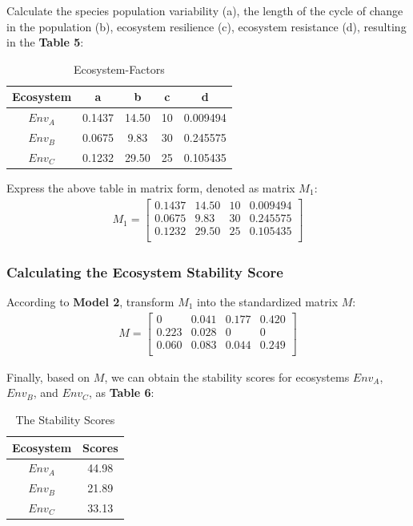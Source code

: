 \documentclass{mcmthesis}
\begin{document}
Calculate the species population variability (a), the length of the cycle of change in the population (b), ecosystem resilience (c), ecosystem resistance (d), resulting in the \textbf{Table 5}:

\begin{table}[!ht]
    \centering
    \begin{tabular}{ccccc}
    \hline
        \textbf{Ecosystem} & \textbf{a} & \textbf{b} & \textbf{c} & \textbf{d } \\ \hline
        \textbf{$Env_{A}$} & 0.1437 & 14.50 & 10 & 0.009494  \\ 
        \textbf{$Env_{B}$} & 0.0675 & 9.83 & 30 & 0.245575  \\ 
        \textbf{$Env_{C}$} & 0.1232 & 29.50 & 25 & 0.105435  \\ \hline
    \end{tabular}
    \caption{Ecosystem-Factors}
    \label{Ecosystem-Factors}
\end{table}

Express the above table in matrix form, denoted as matrix $M_1$:
\begin{align}
M_1=\left[\begin{matrix}0.1437&14.50&10&0.009494\\0.0675&9.83&30&0.245575\\0.1232&29.50&25&0.105435\\\end{matrix}\right]
\end{align}

\subsubsection{Calculating the Ecosystem Stability Score}
According to \textbf{Model 2}, transform $M_1$ into the standardized matrix $M$:
\begin{align}
M=\left[\begin{matrix}0&0.041&0.177&0.420\\0.223&0.028&0&0\\0.060&0.083&0.044&0.249\\\end{matrix}\right]
\end{align}

Finally, based on $M$, we can obtain the stability scores for ecosystems $Env_{A}$, $Env_{B}$, and $Env_{C}$, as \textbf{Table 6}:

\begin{table}[!ht]
    \centering
    \begin{tabular}{cc}
    \hline
        \textbf{Ecosystem} & \textbf{Scores } \\ \hline
        \textbf{$Env_{A}$} & 44.98  \\ 
        \textbf{$Env_{B}$} & 21.89  \\ 
        \textbf{$Env_{C}$} & 33.13  \\ \hline
    \end{tabular}
    \caption{The Stability Scores}
    \label{The Stability Scores}
\end{table}
\end{document}
